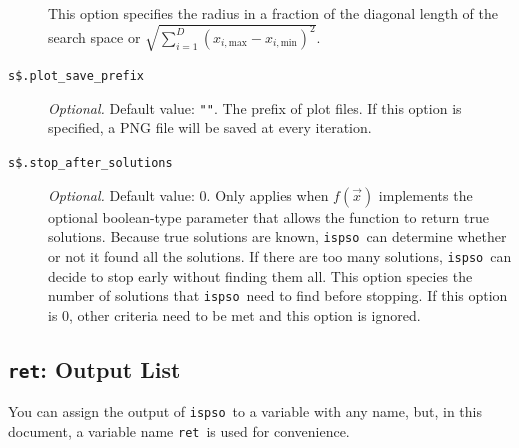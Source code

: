 \documentclass{article}
\def\ispso{\texttt{ispso}}
\def\ret{\texttt{ret}}
\begin{document}
\begin{description}
    This option specifies the radius in a fraction of the diagonal length of the search space or $\sqrt{\sum_{i=1}^D\left(x_{i,\text{max}}-x_{i,\text{min}}\right)^2}$.
  \item[\texttt{s\$.plot\_save\_prefix}]
    \textit{Optional.}
    Default value: \texttt{""}.
    The prefix of plot files.
    If this option is specified, a PNG file will be saved at every iteration.
  \item[\texttt{s\$.stop\_after\_solutions}]
    \textit{Optional.}
    Default value: 0.
    Only applies when $f(\vec{x})$ implements the optional boolean-type parameter that allows the function to return true solutions.
    Because true solutions are known, \ispso\ can determine whether or not it found all the solutions.
    If there are too many solutions, \ispso\ can decide to stop early without finding them all.
    This option species the number of solutions that \ispso\ need to find before stopping.
    If this option is 0, other criteria need to be met and this option is ignored.
\end{description}

\subsection{\ret: Output List}

You can assign the output of \ispso\ to a variable with any name, but, in this document, a variable name \ret\ is used for convenience.
\end{document}
